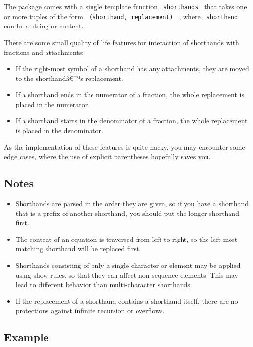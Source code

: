 The package comes with a single template function
\texttt{\ shorthands\ } that takes one or more tuples of the form
\texttt{\ (shorthand,\ replacement)\ } , where \texttt{\ shorthand\ }
can be a string or content.

There are some small quality of life features for interaction of
shorthands with fractions and attachments:

\begin{itemize}
\tightlist
\item
  If the right-most symbol of a shorthand has any attachments, they are
  moved to the shorthandâ€™s replacement.
\item
  If a shorthand ends in the numerator of a fraction, the whole
  replacement is placed in the numerator.
\item
  If a shorthand starts in the denominator of a fraction, the whole
  replacement is placed in the denominator.
\end{itemize}

As the implementation of these features is quite hacky, you may
encounter some edge cases, where the use of explicit parentheses
hopefully saves you.

\subsection{Notes}\label{notes}

\begin{itemize}
\item
  Shorthands are parsed in the order they are given, so if you have a
  shorthand that is a prefix of another shorthand, you should put the
  longer shorthand first.
\item
  The content of an equation is traversed from left to right, so the
  left-most matching shorthand will be replaced first.
\item
  Shorthands consisting of only a single character or element may be
  applied using show rules, so that they can affect non-sequence
  elements. This may lead to different behavior than multi-character
  shorthands.
\item
  If the replacement of a shorthand contains a shorthand itself, there
  are no protections against infinite recursion or overflows.
\end{itemize}

\subsection{Example}\label{example}

